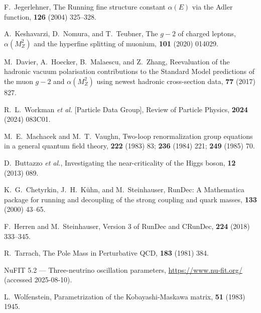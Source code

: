 \documentclass[%
 amsmath,amssymb,
 aps,
prb,
floatfix, showkeys
]{revtex4-2}
\begin{document}
\begin{thebibliography}{99}
F.~Jegerlehner,
\newblock The Running fine structure constant $\alpha(E)$ via the Adler function,
 {\bf 126} (2004) 325--328.

A.~Keshavarzi, D.~Nomura, and T.~Teubner,
\newblock The $g{-}2$ of charged leptons, $\alpha(M_Z^2)$ and the hyperfine splitting of muonium,
 {\bf 101} (2020) 014029.

M.~Davier, A.~Hoecker, B.~Malaescu, and Z.~Zhang,
\newblock Reevaluation of the hadronic vacuum polarisation contributions to the Standard Model predictions of the muon $g{-}2$ and $\alpha(M_Z^2)$ using newest hadronic cross-section data,
 {\bf 77} (2017) 827.

R.~L.~Workman {\em et al.} [Particle Data Group],
\newblock Review of Particle Physics,
 {\bf 2024} (2024) 083C01.

M.~E.~Machacek and M.~T.~Vaughn,
\newblock Two-loop renormalization group equations in a general quantum field theory,
 {\bf 222} (1983) 83; {\bf 236} (1984) 221; {\bf 249} (1985) 70.

D.~Buttazzo {\em et al.},
\newblock Investigating the near-criticality of the Higgs boson,
 {\bf 12} (2013) 089.

K.~G.~Chetyrkin, J.~H.~K{\"u}hn, and M.~Steinhauser,
\newblock RunDec: A Mathematica package for running and decoupling of the strong coupling and quark masses,
 {\bf 133} (2000) 43--65.

F.~Herren and M.~Steinhauser,
\newblock Version 3 of RunDec and CRunDec,
 {\bf 224} (2018) 333--345.

R.~Tarrach,
\newblock The Pole Mass in Perturbative QCD,
 {\bf 183} (1981) 384.

NuFIT 5.2 --- Three-neutrino oscillation parameters,
\newblock \url{https://www.nu-fit.org/} (accessed 2025-08-10).

L.~Wolfenstein,
\newblock Parametrization of the Kobayashi-Maskawa matrix,
 {\bf 51} (1983) 1945.



\end{thebibliography}
\end{document}
